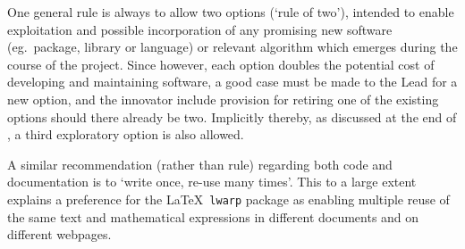 One general rule is always to allow two options (`rule of two'), intended to enable exploitation 
and possible incorporation of any promising new software (eg.\ package, library or language)
or relevant algorithm which emerges during the course of the project.
Since however, each option doubles the potential cost of developing and maintaining software,
a good case must be made to the Lead for a new option, and the innovator include provision
for retiring one of the existing options should there already be two. Implicitly
thereby, as discussed at the end of , a third exploratory option is also allowed.

A similar recommendation (rather than rule) regarding both code and documentation is to
`write once, re-use many times'.
This to a large extent explains a preference for the \LaTeX \ {\tt lwarp} package as enabling
multiple reuse of the same text and mathematical expressions in different
documents and on different webpages.



